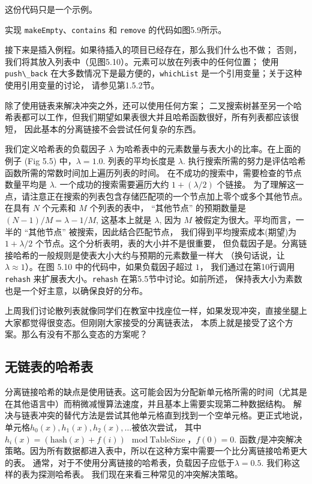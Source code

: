 \documentclass[a4paper]{ctexart}
\theoremstyle{definition}
\theoremstyle{definition}
\begin{document}
这份代码只是一个示例。

实现 \verb|makeEmpty|、\verb|contains| 和 \verb|remove| 的代码如图5.9所示。

接下来是插入例程。如果待插入的项目已经存在，那么我们什么也不做；
否则，我们将其放入列表中（见图5.10）。元素可以放在列表中的任何位置；
使用 \verb|push\_back| 在大多数情况下是最方便的，\verb|whichList| 是一个引用变量；关于这种使用引用变量的讨论，
请参见第1.5.2节。

除了使用链表来解决冲突之外，还可以使用任何方案；
二叉搜索树甚至另一个哈希表都可以工作，但我们期望如果表很大并且哈希函数很好，所有列表都应该很短，
因此基本的分离链接不会尝试任何复杂的东西。

我们定义哈希表的负载因子 $\lambda$ 为哈希表中的元素数量与表大小的比率。在上面的例子 (Fig 5.5) 中，$\lambda = 1.0$. 
列表的平均长度是 $\lambda$. 执行搜索所需的努力是评估哈希函数所需的常数时间加上遍历列表的时间。
在不成功的搜索中，需要检查的节点数量平均是 $\lambda$. 一个成功的搜索需要遍历大约 $1 + (\lambda/2)$ 个链接。
为了理解这一点，请注意正在搜索的列表包含存储匹配项的一个节点加上零个或多个其他节点。
在具有 $N$ 个元素和 $M$ 个列表的表中， ``其他节点'' 的预期数量是 $(N - 1)/M = \lambda - 1/M$, 
这基本上就是 $\lambda$, 因为 $M$ 被假定为很大。平均而言，一半的 ``其他节点'' 被搜索，因此结合匹配节点，
我们得到平均搜索成本(期望)为 $1 + \lambda/2$ 个节点。这个分析表明，表的大小并不是很重要，
但负载因子是。分离链接哈希的一般规则是使表大小大约与预期的元素数量一样大
（换句话说，让 $\lambda \approx 1$）。在图 5.10 中的代码中，如果负载因子超过 $1$，
我们通过在第10行调用 \verb|rehash| 来扩展表大小。\verb|rehash| 在第5.5节中讨论。如前所述，
保持表大小为素数也是一个好主意，以确保良好的分布。

上周我们讨论散列表就像同学们在教室中找座位一样，如果发现冲突，直接坐腿上大家都觉得很变态。但刚刚大家接受的分离链表法，
本质上就是接受了这个方案。那么有没有不那么变态的方案呢？

\subsection{无链表的哈希表}

分离链接哈希的缺点是使用链表。这可能会因为分配新单元格所需的时间（尤其是在其他语言中）而稍微减慢算法速度，并且基本上需要实现第二种数据结构。
解决与链表冲突的替代方法是尝试其他单元格直到找到一个空单元格。更正式地说，单元格$h_0(x), h_1(x), h_2(x), \ldots$被依次尝试，
其中$h_i(x) = (\text{hash}(x) + f(i)) \mod \text{TableSize}$，$f(0) = 0$. 
函数$f$是冲突解决策略。因为所有数据都进入表中，所以在这种方案中需要一个比分离链接哈希更大的表。
通常，对于不使用分离链接的哈希表，负载因子应低于$\lambda = 0.5$. 我们称这样的表为探测哈希表。
我们现在来看三种常见的冲突解决策略。
\end{document}

